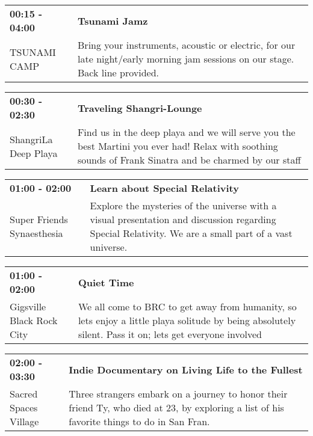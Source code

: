 \begin{tabular}{ p{1in} p{2.2in} }
    \textbf{00:15 - 04:00} & \textbf{Tsunami Jamz} \\
    TSUNAMI CAMP \newline  & Bring your instruments, acoustic or electric, for our late night/early morning jam sessions on our stage.  Back line provided. \\
    \hline 
\end{tabular}
    
\begin{tabular}{ p{1in} p{2.2in} }
    \textbf{00:30 - 02:30} & \textbf{Traveling Shangri-Lounge} \\
    ShangriLa \newline Deep Playa & Find us in the deep playa and we will serve you the best Martini you ever had! Relax with soothing sounds of Frank Sinatra and be charmed by our staff \\
    \hline 
\end{tabular}
    
\begin{tabular}{ p{1in} p{2.2in} }
    \textbf{01:00 - 02:00} & \textbf{Learn about Special Relativity} \\
    Super Friends Synaesthesia \newline  & Explore the mysteries of the universe with a visual presentation and discussion regarding Special Relativity. We are a small part of a vast universe. \\
    \hline 
\end{tabular}
    
\begin{tabular}{ p{1in} p{2.2in} }
    \textbf{01:00 - 02:00} & \textbf{Quiet Time} \\
    Gigsville \newline Black Rock City & We all come to BRC to get away from humanity, so lets enjoy a little playa solitude by being absolutely silent. Pass it on; lets get everyone involved \\
    \hline 
\end{tabular}
    
\begin{tabular}{ p{1in} p{2.2in} }
    \textbf{02:00 - 03:30} & \textbf{Indie Documentary on Living Life to the Fullest} \\
    Sacred Spaces Village \newline  & Three strangers embark on a journey to honor their friend Ty, who died at 23, by exploring a list of his favorite things to do in San Fran. \\
    \hline 
\end{tabular}
    
